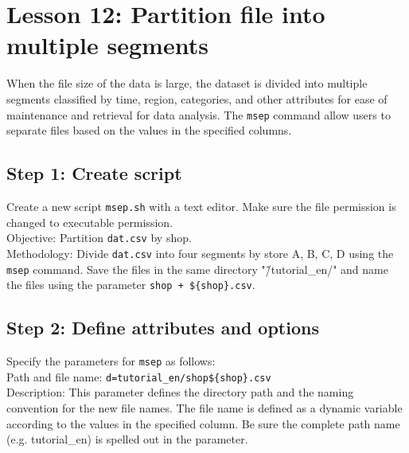 

%

\section{Lesson 12: Partition file into multiple segments }

When the file size of the data is large, the dataset is divided into multiple segments classified by time, region, categories, and other attributes for ease of maintenance and retrieval for data analysis. The \verb|msep| command allow users to  separate files based on the values in the specified columns. 

\subsection{Step 1: Create script}

Create a new script \verb|msep.sh| with a text editor. Make sure the file permission is changed to executable permission. \\

Objective:  Partition \verb|dat.csv| by shop.  \\ 

Methodology: Divide \verb|dat.csv| into four segments by store A, B, C, D using the \verb|msep| command. Save the files in the same directory "\~/tutorial\_en/" and name the files using the parameter \verb|shop + ${shop}.csv|. 
 
 \subsection{Step 2: Define attributes and options }

{\setlength{\parindent}{0cm}

Specify the parameters for \verb|msep| as follows: \\

Path and file name: 		\verb|d=tutorial_en/shop${shop}.csv| \\
Description: 	This parameter defines the directory path and the naming convention for the new file names. The file name is defined as a dynamic variable according to the values in the specified column. Be sure the complete path name (e.g. tutorial\_en)  is spelled out in the parameter.
}

